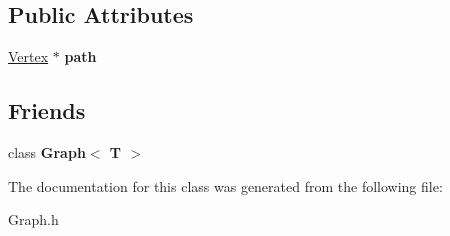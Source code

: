 \subsection*{Public Attributes}
\begin{DoxyCompactItemize}
\item 
\hyperlink{class_vertex}{Vertex} $\ast$ {\bfseries path}\hypertarget{class_vertex_abd40febd917aa25add6bd42237c8463a}{}\label{class_vertex_abd40febd917aa25add6bd42237c8463a}

\end{DoxyCompactItemize}
\subsection*{Friends}
\begin{DoxyCompactItemize}
\item 
class {\bfseries Graph$<$ T $>$}\hypertarget{class_vertex_aefa9b76cd57411c5354e5620dc2d84dd}{}\label{class_vertex_aefa9b76cd57411c5354e5620dc2d84dd}

\end{DoxyCompactItemize}


The documentation for this class was generated from the following file\+:\begin{DoxyCompactItemize}
\item 
Graph.\+h\end{DoxyCompactItemize}
